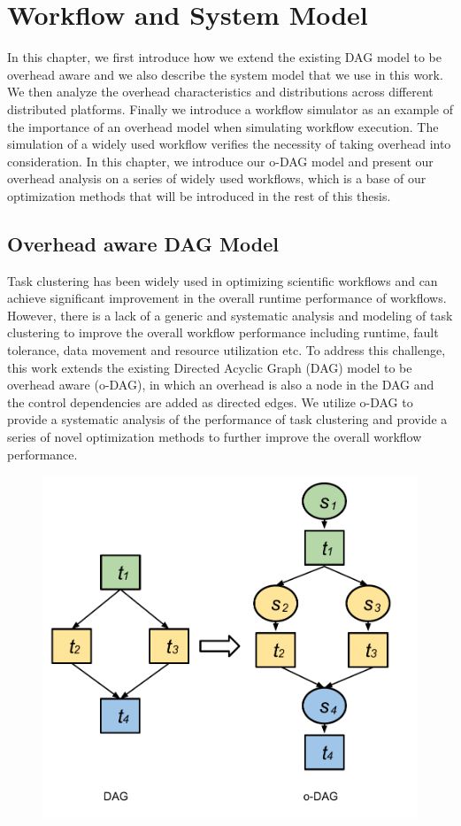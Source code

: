 \chapter{Workflow and System Model}
\label{chap:model}

In this chapter, we first introduce how we extend the existing DAG model to be overhead aware and we also describe the system model that we use in this work. We then analyze the overhead characteristics and distributions across different distributed platforms. Finally we introduce a workflow simulator as an example of the importance of an overhead model when simulating workflow execution. The simulation of a widely used workflow verifies the necessity of taking overhead into consideration. In this chapter, we introduce our o-DAG model and present our overhead analysis on a series of widely used workflows, which is a base of our optimization methods that will be introduced in the rest of this thesis. 


\section{Overhead aware DAG Model}

Task clustering has been widely used in optimizing scientific workflows and can achieve significant improvement in the overall runtime performance \cite{Rynge2012, Singh2008, Li2011, Cao2008} of workflows. However,  there is a lack of a generic and systematic analysis and modeling of task clustering to improve the overall workflow performance including runtime, fault tolerance, data movement and resource utilization etc. To address this challenge, this work extends the existing Directed Acyclic Graph (DAG) model to be overhead aware (o-DAG), in which an overhead is also a node in the DAG and the control dependencies are added as directed edges. We utilize o-DAG to provide a systematic analysis of the performance of task clustering and provide a series of novel optimization methods to further improve the overall workflow performance. 




\begin{figure}[h!]
\includegraphics[width=0.6\linewidth]{figures/introduction/odag.pdf}
\centering
  \label{fig:intro_odag}
\end{figure}

